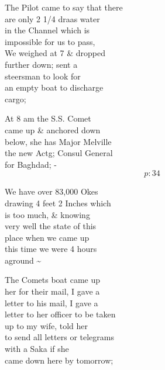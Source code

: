 \documentclass{report}
\begin{document}
	\par{
 	The Pilot came to say that there\ \\are only 2 1/4 draas water\ \\in the Channel which is\ \\impossible for us to pass,\ \\We weighed at 7 \& dropped\ \\further down; sent a\ \\steersman to look for\ \\an empty boat to discharge\ \\cargo;\ \\
	}

	\par{
 	At 8 am the S.S. Comet\ \\came up \& anchored down\ \\below, she has Major Melville\ \\the new Actg; Consul General\ \\for Baghdad; -\ \\
  \[p: 34 \]

	}


	\par{
 	We have over 83,000 Okes\ \\drawing 4 feet 2 Inches which\ \\is too much, \& knowing\ \\very well the state of this\ \\place when we came up\ \\this time we were 4 hours\ \\aground \~{}\ \\
	}

	\par{
 	The Comets boat came up\ \\her for their mail, I gave a\ \\letter to his mail, I gave a\ \\letter to her officer to be taken\ \\up to my wife, told her\ \\to send all letters or telegrams\ \\with a Saka if she\ \\came down here by tomorrow;\ \\
	}
\end{document}
